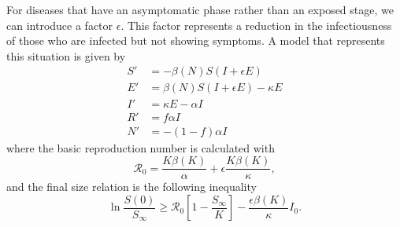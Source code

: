 For diseases that have an asymptomatic phase rather than an exposed stage, we can introduce a factor $\epsilon$.
This factor represents a reduction in the infectiousness of those who are infected but not showing symptoms.
A model that represents this situation is given by
\begin{align}
    S' &= - \beta(N)S(I + \epsilon E) \nonumber \\
    E' &= \beta(N)S(I + \epsilon E) - \kappa E \nonumber \\
    I' &= \kappa E - \alpha I \nonumber \\
    R' &= f \alpha I \nonumber \\
    N' &= - (1 - f) \alpha I
\end{align}
where the basic reproduction number is calculated with
\begin{equation}
    \mathcal{R}_0 = \frac{K\beta(K)}{\alpha} + \epsilon\frac{K\beta(K)}{\kappa},
\end{equation}
and the final size relation is the following inequality
\begin{equation}
    \ln\frac{S(0)}{S_\infty} \geq \mathcal{R}_0 \left[ 1 - \frac{S_\infty}{K} \right] - \frac{\epsilon\beta(K)}{\kappa}I_0.
\end{equation}
